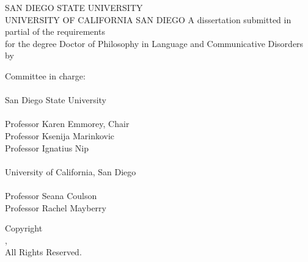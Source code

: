 
    \begin{titlepage}
        \begin{center}
            SAN DIEGO STATE UNIVERSITY \\
            UNIVERSITY OF CALIFORNIA SAN DIEGO
            \vfill \mytitle \vfill
            A dissertation submitted in partial of the requirements\\ for the degree Doctor of Philosophy
            \vfill in \vfill
            Language and Communicative Disorders
            \vfill by \vfill \myname \vfill
        \end{center}
        \begin{flushleft}    
        Committee in charge:\\~\\
            \hspace{.5in}San Diego State University \\~\\
                \hspace{1in}Professor Karen Emmorey, Chair\\
                \hspace{1in}Professor Ksenija Marinkovic\\
                \hspace{1in}Professor Ignatius Nip\\~\\
            \hspace{.5in}University of California, San Diego \\~\\
                \hspace{1in}Professor Seana Coulson\\
                \hspace{1in}Professor Rachel Mayberry\\
        \end{flushleft}
        \begin{center}
            \the\year       
        \end{center}
        \end{titlepage}
        \pagebreak  
        \thispagestyle{empty}
        \doublespacing
        \null\vfill
        \begin{center}
            Copyright \\
            \myname, \the\year \\
            All Rights Reserved.
        \end{center}
